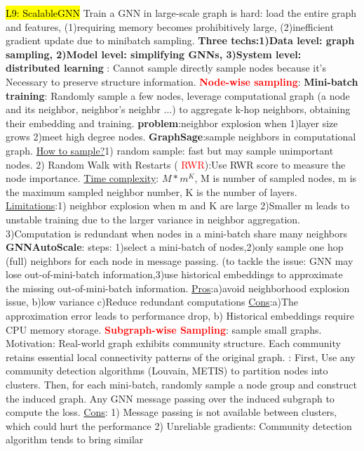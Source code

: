 \hl{L9: ScalableGNN}
Train a GNN in large-scale graph is hard: load the entire graph and features, (1)requiring memory becomes prohibitively large, (2)inefficient gradient update due to minibatch sampling.
\textbf{Three techs:1)Data level: graph sampling, 2)Model level: simplifying GNNs, 3)System level: distributed learning} : Cannot sample directly sample nodes because 
it's Necessary to preserve structure information.     \textbf{\textcolor{red}{Node-wise sampling}}: \textbf{Mini-batch training}: Randomly sample a few nodes, leverage computational graph (a node and its neighbor, neighbor's neighbr ...) to aggregate k-hop neighbors, obtaining their embedding and training. \textbf{problem}:neighbor explosion when 1)layer size grows 2)meet high degree nodes. \textbf{GraphSage}:sample neighbors in computational graph. \underline{How to sample?}1) random sample: fast but may sample unimportant nodes. 2) Random Walk with Restarts (
\textcolor{red}{RWR}):Use RWR score to measure the node importance. \underline{Time complexity}: $M*m^K$, M is number of sampled nodes, m is the maximum sampled neighbor number, K is the number of layers. \underline{Limitations}:1) neighbor explosion when m and K are large 2)Smaller m leads to unstable training due to the larger variance in neighbor aggregation. 3)Computation is redundant when nodes in a mini-batch share many neighbors \textbf{GNNAutoScale}: steps: 1)select a mini-batch of nodes,2)only sample one hop (full) neighbors for each node in message passing. (to tackle the issue: GNN may lose out-of-mini-batch information,3)use historical embeddings to approximate the missing out-of-mini-batch information. \underline{Pros}:a)avoid neighborhood
explosion issue, b)low variance c)Reduce redundant computations \underline{Cons}:a)The approximation error leads to performance drop, b) Historical embeddings require CPU memory storage. \textbf{\textcolor{red}{Subgraph-wise Sampling}}: sample small graphs. Motivation: Real-world graph exhibits community structure. Each community retains essential local connectivity patterns of the original graph. : First, Use any community detection algorithms (Louvain, METIS) to partition nodes into clusters. Then, for each mini-batch, randomly sample a node group and construct the induced graph. Any GNN message passing over the induced subgraph to compute the loss. \underline{Cons}: 1) Message passing is not available between clusters, which could hurt the performance 2) Unreliable gradients: Community detection algorithm tends to bring similar
